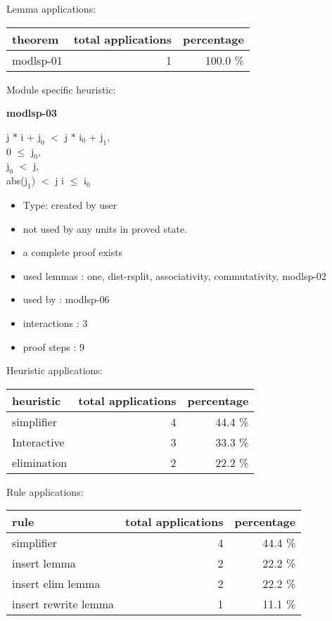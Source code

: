 \documentclass[a4paper]{article}
\begin{document}
Lemma applications:

\begin{supertabular}{l|r|r}
theorem	        & total applications & percentage \\ \hline
modlsp-01 & 1 & 100.0 \% \\

\end{supertabular}

Module specific heuristic:

\pagebreak

{\LARGE\bf modlsp-03}\label{lemma-modlsp-03}

\medskip

j $*$ i + $\mbox{j}_{0}$ $<$ j $*$ $\mbox{i}_{0}$ + $\mbox{j}_{1}$, \\
0 $\le$ $\mbox{j}_{0}$, \\
$\mbox{j}_{0}$ $<$ j, \\
abs($\mbox{j}_{1}$) $<$ j \Fol i $\le$ $\mbox{i}_{0}$

\begin{itemize}

\item Type: created by user

\item not used by any units in proved state.
\item       a complete proof exists
\item       used lemmas  : one, dist-rsplit, associativity, commutativity, modlsp-02
\item       used by      : modlsp-06
\item       interactions : 3
\item       proof steps  : 9
\end{itemize}

\medskip


Heuristic applications:

\begin{supertabular}{l|r|r}
heuristic	& total applications & percentage \\ \hline
simplifier & 4 & 44.4 \% \\
Interactive & 3 & 33.3 \% \\
elimination & 2 & 22.2 \% \\

\end{supertabular}

Rule applications:

\begin{supertabular}{l|r|r}
rule	        & total applications & percentage \\ \hline
simplifier & 4 & 44.4 \% \\
insert lemma & 2 & 22.2 \% \\
insert elim lemma & 2 & 22.2 \% \\
insert rewrite lemma & 1 & 11.1 \% \\

\end{supertabular}
\end{document}
